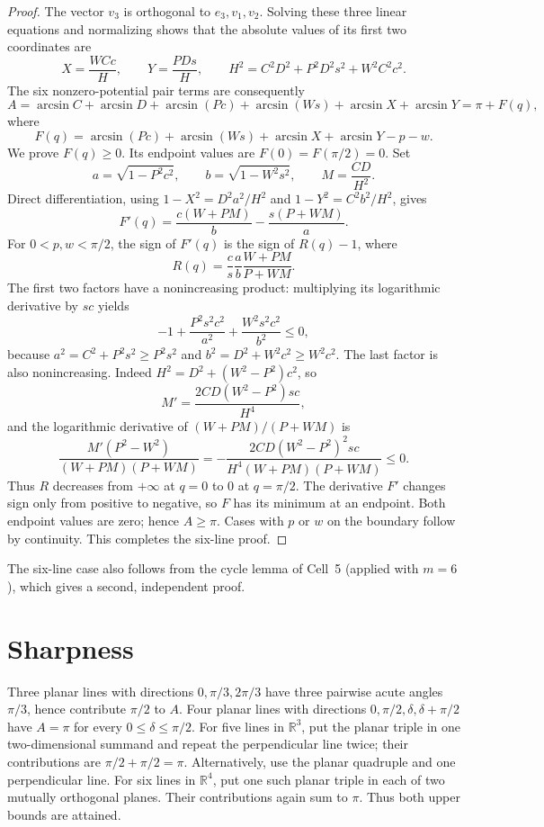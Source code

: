\documentclass[11pt]{article}
\begin{document}
\begin{proof}
The vector $v_3$ is orthogonal to $e_3,v_1,v_2$.  Solving these
three linear equations and normalizing shows that the absolute
values of its first two coordinates are
\[
 X=\frac{WCc}{H},\qquad Y=\frac{PDs}{H},\qquad
 H^2=C^2D^2+P^2D^2s^2+W^2C^2c^2.
\]
The six nonzero-potential pair terms are consequently
\[
 A=\arcsin C+\arcsin D+\arcsin(Pc)+\arcsin(Ws)
       +\arcsin X+\arcsin Y
   =\pi+F(q),
\]
where
\[
 F(q)=\arcsin(Pc)+\arcsin(Ws)+\arcsin X+\arcsin Y-p-w.
\]
We prove $F(q)\geq0$.  Its endpoint values are
$F(0)=F(\pi/2)=0$.  Set
\[
 a=\sqrt{1-P^2c^2},\qquad b=\sqrt{1-W^2s^2},\qquad
 M=\frac{CD}{H^2}.
\]
Direct differentiation, using $1-X^2=D^2a^2/H^2$ and
$1-Y^2=C^2b^2/H^2$, gives
\[
 F'(q)=\frac{c(W+PM)}{b}-\frac{s(P+WM)}{a}.
\]
For $0<p,w<\pi/2$, the sign of $F'(q)$ is the sign of $R(q)-1$,
where
\[
 R(q)=\frac{c}{s}\frac{a}{b}\frac{W+PM}{P+WM}.
\]
The first two factors have a nonincreasing product: multiplying
its logarithmic derivative by $sc$ yields
\[
 -1+\frac{P^2s^2c^2}{a^2}
    +\frac{W^2s^2c^2}{b^2}\leq0,
\]
because $a^2=C^2+P^2s^2\geq P^2s^2$ and
$b^2=D^2+W^2c^2\geq W^2c^2$.  The last factor is also
nonincreasing.  Indeed $H^2=D^2+(W^2-P^2)c^2$, so
\[
 M'=\frac{2CD(W^2-P^2)sc}{H^4},
\]
and the logarithmic derivative of $(W+PM)/(P+WM)$ is
\[
 \frac{M'(P^2-W^2)}{(W+PM)(P+WM)}
 =-\frac{2CD(W^2-P^2)^2sc}
 {H^4(W+PM)(P+WM)}\leq0.
\]
Thus $R$ decreases from $+\infty$ at $q=0$ to $0$ at
$q=\pi/2$.  The derivative $F'$ changes sign only from positive
to negative, so $F$ has its minimum at an endpoint.  Both endpoint
values are zero; hence $A\geq\pi$.  Cases with $p$ or $w$ on the
boundary follow by continuity.  This completes the six-line proof.
\end{proof}

\noindent The six-line case also follows from the cycle lemma of Cell~5 (applied with $m=6$),
which gives a second, independent proof.

\section*{Sharpness}

Three planar lines with directions $0,\pi/3,2\pi/3$ have three
pairwise acute angles $\pi/3$, hence contribute $\pi/2$ to $A$.
Four planar lines with directions $0,\pi/2,\delta,\delta+\pi/2$
have $A=\pi$ for every $0\leq\delta\leq\pi/2$.
For five lines in $\mathbb R^3$, put the planar triple in one
two-dimensional summand and repeat the perpendicular line twice;
their contributions are $\pi/2+\pi/2=\pi$.  Alternatively, use
the planar quadruple and one perpendicular line.  For six lines in
$\mathbb R^4$, put one such planar triple in each of two mutually
orthogonal planes.  Their contributions again sum to $\pi$.
Thus both upper bounds are attained.
\end{document}
